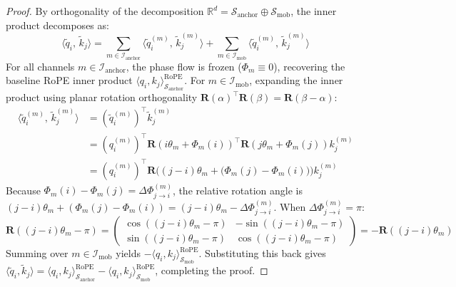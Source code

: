 \documentclass[11pt,a4paper]{article}
\theoremstyle{definition}
\begin{document}
\begin{proof}
By orthogonality of the decomposition $\mathbb{R}^d = \mathcal{S}_{\text{anchor}} \oplus \mathcal{S}_{\text{mob}}$, the inner product decomposes as:
\begin{equation}
\langle \tilde{q}_i, \, \tilde{k}_j \rangle = \sum_{m \in \mathcal{I}_{\text{anchor}}} \langle \tilde{q}_i^{(m)}, \, \tilde{k}_j^{(m)} \rangle + \sum_{m \in \mathcal{I}_{\text{mob}}} \langle \tilde{q}_i^{(m)}, \, \tilde{k}_j^{(m)} \rangle
\end{equation}
For all channels $m \in \mathcal{I}_{\text{anchor}}$, the phase flow is frozen ($\Phi_m \equiv 0$), recovering the baseline RoPE inner product $\langle q_i, k_j \rangle_{\mathcal{S}_{\text{anchor}}}^{\mathrm{RoPE}}$. For $m \in \mathcal{I}_{\text{mob}}$, expanding the inner product using planar rotation orthogonality $\mathbf{R}(\alpha)^\top \mathbf{R}(\beta) = \mathbf{R}(\beta - \alpha)$:
\begin{align}
\langle \tilde{q}_i^{(m)}, \, \tilde{k}_j^{(m)} \rangle &= (\tilde{q}_i^{(m)})^\top \tilde{k}_j^{(m)} \nonumber \\
&= (q_i^{(m)})^\top \mathbf{R}(i\theta_m + \Phi_m(i))^\top \mathbf{R}(j\theta_m + \Phi_m(j)) k_j^{(m)} \nonumber \\
&= (q_i^{(m)})^\top \mathbf{R}\Big( (j - i)\theta_m + \big(\Phi_m(j) - \Phi_m(i)\big) \Big) k_j^{(m)}
\end{align}
Because $\Phi_m(i) - \Phi_m(j) = \Delta \Phi_{j \to i}^{(m)}$, the relative rotation angle is $(j - i)\theta_m + (\Phi_m(j) - \Phi_m(i)) = (j - i)\theta_m - \Delta \Phi_{j \to i}^{(m)}$. When $\Delta \Phi_{j \to i}^{(m)} = \pi$:
\begin{equation}
\mathbf{R}((j - i)\theta_m - \pi) = \begin{pmatrix} \cos((j-i)\theta_m - \pi) & -\sin((j-i)\theta_m - \pi) \\ \sin((j-i)\theta_m - \pi) & \cos((j-i)\theta_m - \pi) \end{pmatrix} = -\mathbf{R}((j - i)\theta_m)
\end{equation}
Summing over $m \in \mathcal{I}_{\text{mob}}$ yields $-\langle q_i, k_j \rangle_{\mathcal{S}_{\text{mob}}}^{\mathrm{RoPE}}$. Substituting this back gives $\langle \tilde{q}_i, \tilde{k}_j \rangle = \langle q_i, k_j \rangle_{\mathcal{S}_{\text{anchor}}}^{\mathrm{RoPE}} - \langle q_i, k_j \rangle_{\mathcal{S}_{\text{mob}}}^{\mathrm{RoPE}}$, completing the proof.
\end{proof}
\end{document}
